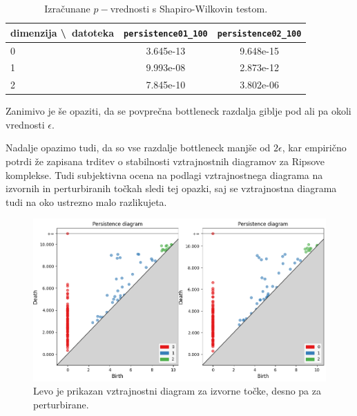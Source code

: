 \documentclass[a4paper,11pt]{article}
\theoremstyle{definition}
\theoremstyle{plain}
\begin{document}
\begin{table}[ht!]
    \centering
    \begin{tabular}{|l|c|c|}
    \hline
    dimenzija \textbackslash \ datoteka & \texttt{persistence01\_100} & \texttt{persistence02\_100} \\ \hline
    0                                 & 3.645e-13          & 9.648e-15          \\ \hline
    1                                 & 9.993e-08          & 2.873e-12          \\ \hline
    2                                 & 7.845e-10          & 3.802e-06          \\ \hline
    \end{tabular}
    \caption{Izračunane $p-$vrednosti s Shapiro-Wilkovin testom.}
    \label{tabela:p}
\end{table}
\noindent
Zanimivo je še opaziti, da se povprečna bottleneck razdalja giblje pod ali pa okoli vrednosti $\epsilon$.

Nadalje opazimo tudi, da so vse razdalje bottleneck manjše od $2 \epsilon$, kar empirično potrdi že zapisana trditev o stabilnosti vztrajnostnih diagramov za Ripsove komplekse.
Tudi subjektivna ocena na podlagi vztrajnostnega diagrama na izvornih in perturbiranih točkah sledi tej opazki, saj se vztrajnostna diagrama tudi na oko ustrezno malo razlikujeta.

\begin{figure}[ht!]
    \centering
    \includegraphics[width=150mm]{../slike/primerjava_diagramov.png}
    \caption{Levo je prikazan vztrajnostni diagram za izvorne točke, desno pa za perturbirane.}
    \label{slika:primerjava}
\end{figure}

\end{document}
